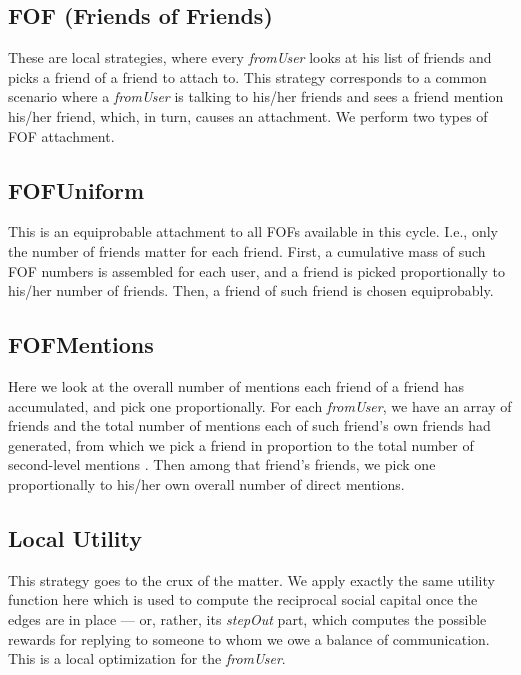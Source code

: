 \documentclass[10pt,oneside]{memoir}
\begin{document}
\begin{Spacing}{2}
\subsection{FOF (Friends of Friends)}
\label{foffriendsoffriends}

These are local strategies, where every \emph{fromUser} looks at his list of friends and picks a friend of a friend to attach to.  This strategy corresponds to a common scenario where a \emph{fromUser} is talking to his/her friends and sees a friend mention his/her friend, which, in turn, causes an attachment.  We perform two types of FOF attachment.


\subsection{FOFUniform}
\label{fofuniform}

This is an equiprobable attachment to all FOFs available in this cycle.  I.e., only the number of friends matter for each friend.  First, a cumulative mass of such FOF numbers is assembled for each user, and a friend is picked proportionally to his/her number of friends.  Then, a friend of such friend is chosen equiprobably.


\subsection{FOFMentions}
\label{fofmentions}

Here we look at the overall number of mentions each friend of a friend has accumulated, and pick one proportionally.  For each {\itshape fromUser}, we have an array of friends and the total number of mentions each of such friend's own friends had generated, from which we pick a friend in proportion to the total number of second-level mentions .  Then among that friend's friends, we pick one proportionally to his/her own overall number of direct mentions.


\subsection{Local Utility}
\label{localutility}

This strategy goes to the crux of the matter.  We apply exactly the same utility function here which is used to compute the reciprocal social capital once the edges are in place --- or, rather, its {\itshape stepOut} part, which computes the possible rewards for replying to someone to whom we owe a balance of communication.  This is a local optimization for the {\itshape fromUser}. 



\end{Spacing}
\end{document}
